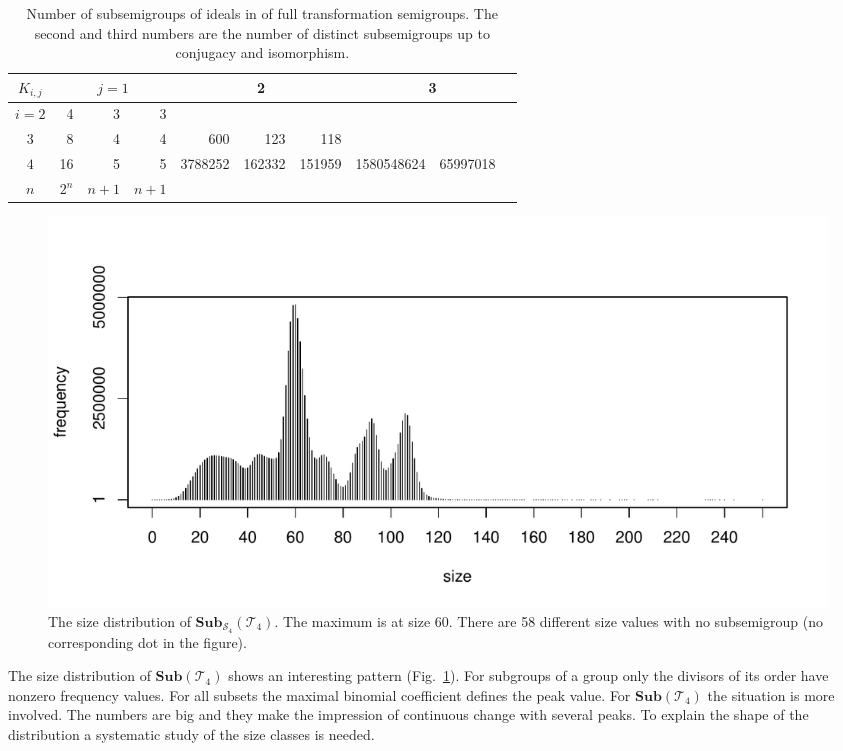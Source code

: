 \documentclass{amsart}
\newcommand{\cT}{{\mathcal T}}
\newcommand{\cS}{{\mathcal S}}
\newcommand{\Sub}{\mathbf{Sub}}
\theoremstyle{plain}
\theoremstyle{definition}
\begin{document}
\begin{table}
\renewcommand{\tabcolsep}{2pt}
\renewcommand{\arraystretch}{1}
\begin{tabular}{|c|r|r|r||r|r|r||r|r|r|}
\hline
$K_{i,j}$ & \multicolumn{3}{c||}{$j=1$} & \multicolumn{3}{c||}{2} & \multicolumn{3}{c|}{3} \\
\hline
$i=2$ & 4&3&3   & \cellcolor{gray9}  & \cellcolor{gray9}&  \cellcolor{gray9} & \cellcolor{gray9}  &\cellcolor{gray9} &\cellcolor{gray9}\\
\hline
$3$ &  8&4&4  &  600 & 123 & 118  & \cellcolor{gray9}  & \cellcolor{gray9}&\cellcolor{gray9}\\
\hline
$4$ & 16&5&5  &  3788252 & 162332 & 151959  & 1580548624  & 65997018&\\
\hline
$n$ & $2^n$&$n+1$&$n+1$    &    & &    &    & & \\
\hline

\end{tabular}
\caption{Number of subsemigroups of ideals in of full transformation semigroups. The second and third numbers are the number of distinct subsemigroups up to conjugacy and isomorphism.}
\end{table}



\begin{figure}
\includegraphics[width=\textwidth]{SubT4distrib}
\caption{The size distribution of $\Sub_{\cS_4}(\cT_4)$. The maximum is at size 60. There are 58 different size values with no subsemigroup (no corresponding dot in the figure).}
\label{fig:SubT4SizeDistrib}
\end{figure}
The size distribution of $\Sub(\cT_4)$ shows an interesting pattern (Fig.\ \ref{fig:SubT4SizeDistrib}).
For subgroups of a group only the divisors of its order have nonzero frequency values.
For all subsets the maximal binomial coefficient defines the peak value.
For $\Sub(\cT_4)$ the situation is more involved.
The numbers are big and they make the impression of continuous change with several peaks.
To explain the shape of the  distribution a systematic study of the size classes is needed. 
\end{document}
